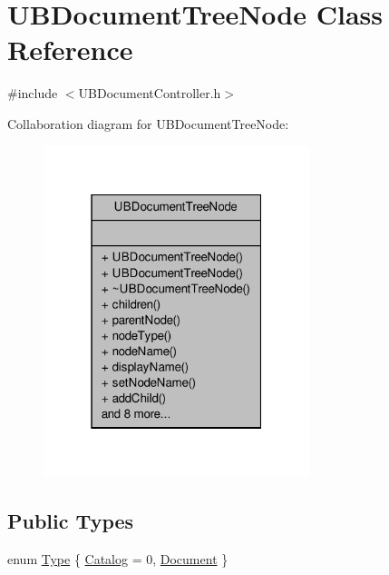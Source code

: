 \hypertarget{class_u_b_document_tree_node}{\section{U\-B\-Document\-Tree\-Node Class Reference}
\label{de/d8b/class_u_b_document_tree_node}
}


{\ttfamily \#include $<$U\-B\-Document\-Controller.\-h$>$}



Collaboration diagram for U\-B\-Document\-Tree\-Node\-:
\nopagebreak
\begin{figure}[H]
\begin{center}
\leavevmode
\includegraphics[width=220pt]{d0/d62/class_u_b_document_tree_node__coll__graph}
\end{center}
\end{figure}
\subsection*{Public Types}
\begin{DoxyCompactItemize}
\item 
enum \hyperlink{class_u_b_document_tree_node_aba3711968b28d176491608c6c451823b}{Type} \{ \hyperlink{class_u_b_document_tree_node_aba3711968b28d176491608c6c451823baf15b26354cd96e9c8974f186adb8bf1e}{Catalog} =  0, 
\hyperlink{class_u_b_document_tree_node_aba3711968b28d176491608c6c451823bae35609de155a6945e883c32052259350}{Document}
 \}
\end{DoxyCompactItemize}
